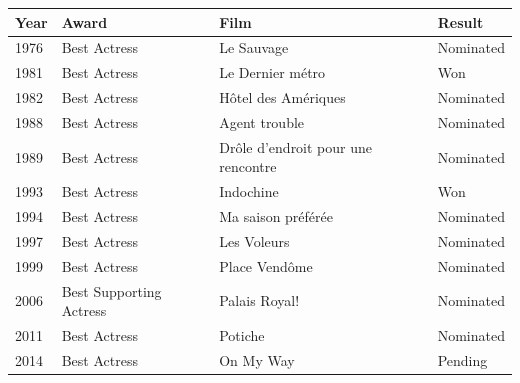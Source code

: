 \documentclass{article}
\begin{document}
\begin{tabular}{llll}
\toprule
Year & Award & Film & Result \\
\midrule
1976 & Best Actress & Le Sauvage & Nominated \\
1981 & Best Actress & Le Dernier métro & Won \\
1982 & Best Actress & Hôtel des Amériques & Nominated \\
1988 & Best Actress & Agent trouble & Nominated \\
1989 & Best Actress & Drôle d'endroit pour une rencontre & Nominated \\
1993 & Best Actress & Indochine & Won \\
1994 & Best Actress & Ma saison préférée & Nominated \\
1997 & Best Actress & Les Voleurs & Nominated \\
1999 & Best Actress & Place Vendôme & Nominated \\
2006 & Best Supporting Actress & Palais Royal! & Nominated \\
2011 & Best Actress & Potiche & Nominated \\
2014 & Best Actress & On My Way & Pending \\
\bottomrule
\end{tabular}
\end{document}

